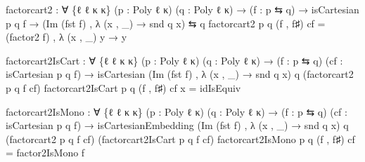 \documentclass[
  11pt,
  oneside,
  article]{memoir}
\newenvironment{Shaded}{}{}
\newcommand{\NormalTok}[1]{#1}
\newcommand{\OtherTok}[1]{\textcolor[rgb]{0.00,0.44,0.13}{#1}}
\theoremstyle{definition}
\theoremstyle{plain}
\newcommand{\0}{\textsf{0}}
\newcommand{\1}{\tn{\textsf{1}}}
\begin{document}
\begin{Shaded}
\begin{Highlighting}[]
\NormalTok{factorcart2 }\OtherTok{:} \OtherTok{∀} \OtherTok{\{}\NormalTok{ℓ ℓ\textquotesingle{} κ κ\textquotesingle{}}\OtherTok{\}} \OtherTok{(}\NormalTok{p }\OtherTok{:}\NormalTok{ Poly ℓ κ}\OtherTok{)} \OtherTok{(}\NormalTok{q }\OtherTok{:}\NormalTok{ Poly ℓ\textquotesingle{} κ\textquotesingle{}}\OtherTok{)}
              \OtherTok{→} \OtherTok{(}\NormalTok{f }\OtherTok{:}\NormalTok{ p ⇆ q}\OtherTok{)} \OtherTok{→}\NormalTok{ isCartesian p q f}
              \OtherTok{→} \OtherTok{(}\NormalTok{Im }\OtherTok{(}\NormalTok{fst f}\OtherTok{)}\NormalTok{ , }\OtherTok{λ} \OtherTok{(}\NormalTok{x , }\OtherTok{\_)} \OtherTok{→}\NormalTok{ snd q x}\OtherTok{)}\NormalTok{ ⇆ q}
\NormalTok{factorcart2 p q }\OtherTok{(}\NormalTok{f , f♯}\OtherTok{)}\NormalTok{ cf }\OtherTok{=} \OtherTok{(}\NormalTok{factor2 f}\OtherTok{)}\NormalTok{ , }\OtherTok{λ} \OtherTok{(}\NormalTok{x , }\OtherTok{\_)}\NormalTok{ y }\OtherTok{→}\NormalTok{ y}

\NormalTok{factorcart2IsCart }\OtherTok{:} \OtherTok{∀} \OtherTok{\{}\NormalTok{ℓ ℓ\textquotesingle{} κ κ\textquotesingle{}}\OtherTok{\}} \OtherTok{(}\NormalTok{p }\OtherTok{:}\NormalTok{ Poly ℓ κ}\OtherTok{)} \OtherTok{(}\NormalTok{q }\OtherTok{:}\NormalTok{ Poly ℓ\textquotesingle{} κ\textquotesingle{}}\OtherTok{)}
                    \OtherTok{→} \OtherTok{(}\NormalTok{f }\OtherTok{:}\NormalTok{ p ⇆ q}\OtherTok{)} \OtherTok{(}\NormalTok{cf }\OtherTok{:}\NormalTok{ isCartesian p q f}\OtherTok{)}
                    \OtherTok{→}\NormalTok{ isCartesian }\OtherTok{(}\NormalTok{Im }\OtherTok{(}\NormalTok{fst f}\OtherTok{)}\NormalTok{ , }\OtherTok{λ} \OtherTok{(}\NormalTok{x , }\OtherTok{\_)} \OtherTok{→}\NormalTok{ snd q x}\OtherTok{)}\NormalTok{ q}
                                  \OtherTok{(}\NormalTok{factorcart2 p q f cf}\OtherTok{)}
\NormalTok{factorcart2IsCart p q }\OtherTok{(}\NormalTok{f , f♯}\OtherTok{)}\NormalTok{ cf x }\OtherTok{=}\NormalTok{ idIsEquiv}

\NormalTok{factorcart2IsMono }\OtherTok{:} \OtherTok{∀} \OtherTok{\{}\NormalTok{ℓ ℓ\textquotesingle{} κ κ\textquotesingle{}}\OtherTok{\}} \OtherTok{(}\NormalTok{p }\OtherTok{:}\NormalTok{ Poly ℓ κ}\OtherTok{)} \OtherTok{(}\NormalTok{q }\OtherTok{:}\NormalTok{ Poly ℓ\textquotesingle{} κ\textquotesingle{}}\OtherTok{)}
                    \OtherTok{→} \OtherTok{(}\NormalTok{f }\OtherTok{:}\NormalTok{ p ⇆ q}\OtherTok{)} \OtherTok{(}\NormalTok{cf }\OtherTok{:}\NormalTok{ isCartesian p q f}\OtherTok{)}
                    \OtherTok{→}\NormalTok{ isCartesianEmbedding}
                        \OtherTok{(}\NormalTok{Im }\OtherTok{(}\NormalTok{fst f}\OtherTok{)}\NormalTok{ , }\OtherTok{λ} \OtherTok{(}\NormalTok{x , }\OtherTok{\_)} \OtherTok{→}\NormalTok{ snd q x}\OtherTok{)}\NormalTok{ q}
                        \OtherTok{(}\NormalTok{factorcart2 p q f cf}\OtherTok{)}
                        \OtherTok{(}\NormalTok{factorcart2IsCart p q f cf}\OtherTok{)}
\NormalTok{factorcart2IsMono p q }\OtherTok{(}\NormalTok{f , f♯}\OtherTok{)}\NormalTok{ cf }\OtherTok{=}\NormalTok{ factor2IsMono f}


\end{Highlighting}
\end{Shaded}
\end{document}

